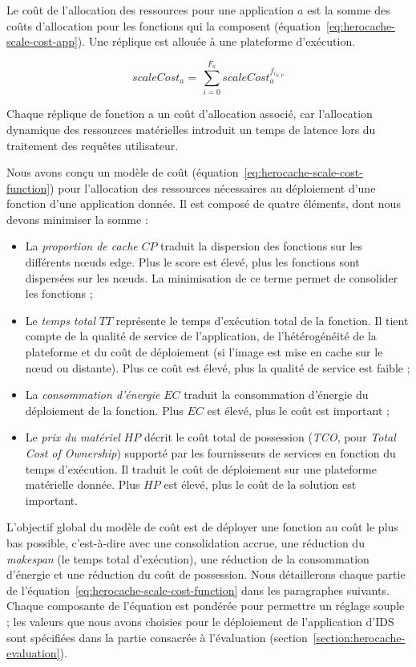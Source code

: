 {Le coût de l'allocation des ressources pour une application $a$ est la somme des coûts d'allocation pour les fonctions qui la composent (équation~\ref{eq:herocache-scale-cost-app}). Une réplique est allouée à une plateforme d'exécution.

\begin{equation}
    scaleCost_{a} = \, \sum_{i = 0}^{F_{a}} scaleCost^{{f}_{{i}_{N, P}}}_a
\label{eq:herocache-scale-cost-app}
\end{equation}

Chaque réplique de fonction a un coût d'allocation associé, car l'allocation dynamique des ressources matérielles introduit un temps de latence lors du traitement des requêtes utilisateur.

Nous avons conçu un modèle de coût (équation~\ref{eq:herocache-scale-cost-function}) pour l'allocation des ressources nécessaires au déploiement d'une fonction d'une application donnée. Il est composé de quatre éléments, dont nous devons minimiser la somme :

\begin{itemize}
    \item La \textit{proportion de cache} $CP$ traduit la dispersion des fonctions sur les différents nœuds edge. Plus le score est élevé, plus les fonctions sont dispersées sur les nœuds. La minimisation de ce terme permet de consolider les fonctions ;
    \item Le \textit{temps total} $TT$ représente le temps d'exécution total de la fonction. Il tient compte de la qualité de service de l'application, de l'hétérogénéité de la plateforme et du coût de déploiement (si l'image est mise en cache sur le nœud ou distante). Plus ce coût est élevé, plus la qualité de service est faible ;
    \item La \textit{consommation d'énergie} $EC$ traduit la consommation d'énergie du déploiement de la fonction. Plus $EC$ est élevé, plus le coût est important ;
    \item Le \textit{prix du matériel} $HP$ décrit le coût total de possession (\textit{TCO}, pour \textit{Total Cost of Ownership}) supporté par les fournisseurs de services en fonction du temps d'exécution. Il traduit le coût de déploiement sur une plateforme matérielle donnée. Plus $HP$ est élevé, plus le coût de la solution est important.
\end{itemize}

L'objectif global du modèle de coût est de déployer une fonction au coût le plus bas possible, c'est-à-dire avec une consolidation accrue, une réduction du \textit{makespan} (le temps total d'exécution), une réduction de la consommation d'énergie et une réduction du coût de possession. Nous détaillerons chaque partie de l'équation~\ref{eq:herocache-scale-cost-function} dans les paragraphes suivants. Chaque composante de l'équation est pondérée pour permettre un réglage souple ; les valeurs que nous avons choisies pour le déploiement de l'application d'\gls{IDS} sont spécifiées dans la partie consacrée à l'évaluation (section~\ref{section:herocache-evaluation}).

}
